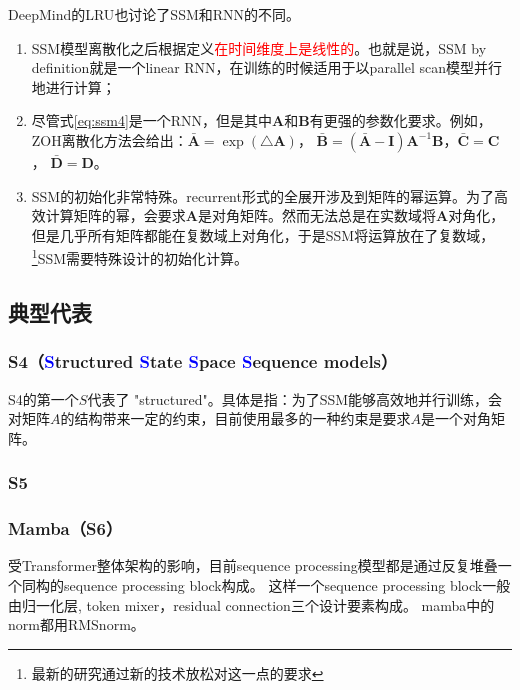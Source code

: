 DeepMind的LRU\cite{orvieto2023resurrecting}也讨论了SSM和RNN的不同。

\begin{enumerate}
\item SSM模型离散化之后根据定义\textcolor{red}{在时间维度上是线性的}。也就是说，SSM by definition就是一个linear RNN，在训练的时候适用于以parallel scan模型并行地进行计算；
\item 尽管式\eqref{eq:ssm4}是一个RNN，但是其中$\mathbf{A}$和$\mathbf{B}$有更强的参数化要求。例如，ZOH离散化方法会给出：$\bar{\mathbf{A}}=\exp\left(\triangle \mathbf{A}\right)$，
$\bar{\mathbf{B}}=\left(\bar{\mathbf{A}} -\mathbf{I}\right)\mathbf{A}^{-1} \mathbf{B}$，$\bar{\mathbf{C}}=\mathbf{C}$，
$\bar{\mathbf{D}}=\mathbf{D}$。
\item SSM的初始化非常特殊。recurrent形式的全展开涉及到矩阵的幂运算。为了高效计算矩阵的幂，会要求$\mathbf{A}$是对角矩阵。然而无法总是在实数域将$\mathbf{A}$对角化，但是几乎所有矩阵都能在复数域上对角化，于是SSM将运算放在了复数域，
\footnote{最新的研究通过新的技术放松对这一点的要求}{SSM需要特殊设计的初始化计算}。
\end{enumerate}

\subsection{典型代表}

\subsubsection{S4（\textcolor{blue}{S}tructured \textcolor{blue}{S}tate \textcolor{blue}{S}pace \textcolor{blue}{S}equence models）\cite{gu2021efficiently}}

S4的第一个$S$代表了 "structured"。具体是指：为了SSM能够高效地并行训练，会对矩阵$A$的结构带来一定的约束，目前使用最多的一种约束是要求$A$是一个对角矩阵。

\subsubsection{S5\cite{smith2022simplified}}

\newpage
\subsubsection{Mamba（S6）\cite{gu2023mamba}}

受Transformer整体架构的影响，目前sequence processing模型都是通过反复堆叠一个同构的sequence processing block构成。
这样一个sequence processing block一般由归一化层, token mixer，residual connection三个设计要素构成。
mamba中的norm都用RMSnorm。

